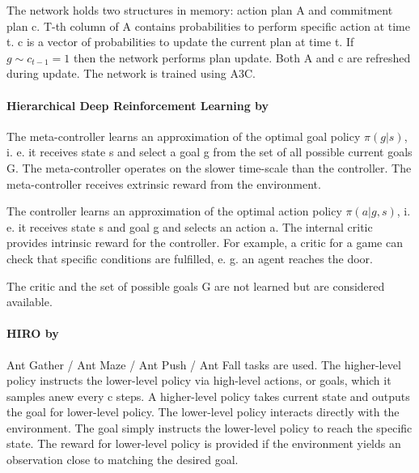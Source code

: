 \documentclass[acmsmall, nonacm]{acmart}
\begin{document}
The network holds two structures in memory: action plan A and commitment plan c. T-th column of A contains probabilities to perform specific action at time t. c is a vector of probabilities to update the current plan at time t. If $g \sim c_{t-1} = 1$ then the network performs plan update. Both A and c are refreshed during update. The network is trained using A3C.


\paragraph{Hierarchical Deep Reinforcement Learning by~\citet{Kulkarni2016HierarchicalDR}} %
\label{par:hierarchical_deep_rl}

The meta-controller learns an approximation of the optimal goal policy $\pi(g|s)$, i. e. it receives state s and select a goal g from the set of all possible current goals G. The meta-controller operates on the slower time-scale than the controller. The meta-controller receives extrinsic reward from the environment.

The controller learns an approximation of the optimal action policy $\pi(a|g,s)$, i. e. it receives state s and goal g and selects an action a. The internal critic provides intrinsic reward for the controller. For example, a critic for a game can check that specific conditions are fulfilled, e. g. an agent reaches the door.

The critic and the set of possible goals G are not learned but are considered available.


\paragraph{HIRO by~\citet{Nachum2018DataEfficientHR}} %
\label{par:hiro}

Ant Gather / Ant Maze / Ant Push / Ant Fall tasks are used. The higher-level policy instructs the lower-level policy via high-level actions, or goals, which it samples anew every c steps. A higher-level policy takes current state and outputs the goal for lower-level policy. The lower-level policy interacts directly with the environment. The goal simply instructs the lower-level policy to reach the specific state. The reward for lower-level policy is provided if the environment yields an observation close to matching the desired goal.
\end{document}
